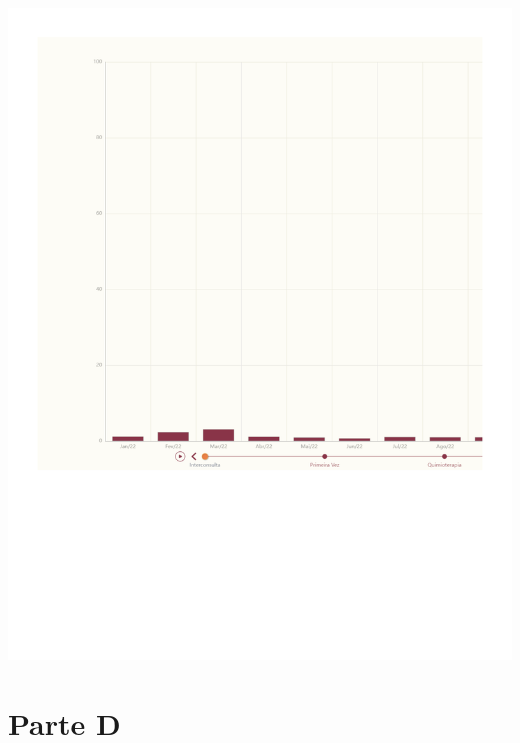 \documentclass[
  letterpaper,
  DIV=11,
  numbers=noendperiod]{scrreprt}
\begin{document}
\includegraphics{2022_files/figure-pdf/unnamed-chunk-8-1.pdf}

\section{Parte D}
\end{document}
